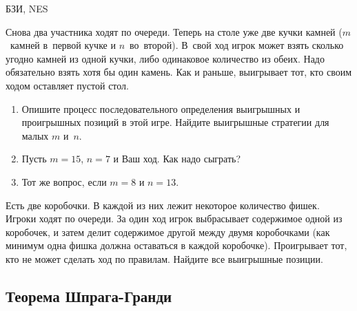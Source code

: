 \begin{problem}
\begin{source}
БЗИ, NES
\end{source}
 Снова два участника ходят по
очереди. Теперь на столе уже две кучки камней ($m$~камней
в~первой кучке и $n$~во~второй). В~свой ход игрок может
взять сколько угодно камней из одной кучки, либо одинаковое
количество из обеих. Надо обязательно взять хотя бы один
камень. Как и раньше, выигрывает тот, кто своим ходом
оставляет пустой стол.

\begin{enumerate}

\item  Опишите процесс последовательного определения
выигрышных и проигрышных позиций в этой игре. Найдите
выигрышные стратегии для малых $m$ и~$n$.

\item Пусть $m=15$, $n=7$ и Ваш ход. Как надо сыграть?

\item Тот же вопрос, если $m=8$ и $n=13$.

\end{enumerate}







\begin{sol}

\end{sol}
\end{problem}

\begin{problem}
Есть две коробочки. В каждой из них лежит некоторое количество фишек. Игроки ходят по очереди. За один ход игрок выбрасывает содержимое одной из коробочек, и затем делит содержимое другой между двумя коробочками (как минимум одна фишка должна оставаться в каждой коробочке). Проигрывает тот, кто не может сделать ход по правилам. Найдите все выигрышные позиции.\par



\begin{sol}

\end{sol}
\end{problem}






\subsection{Теорема Шпрага-Гранди}


